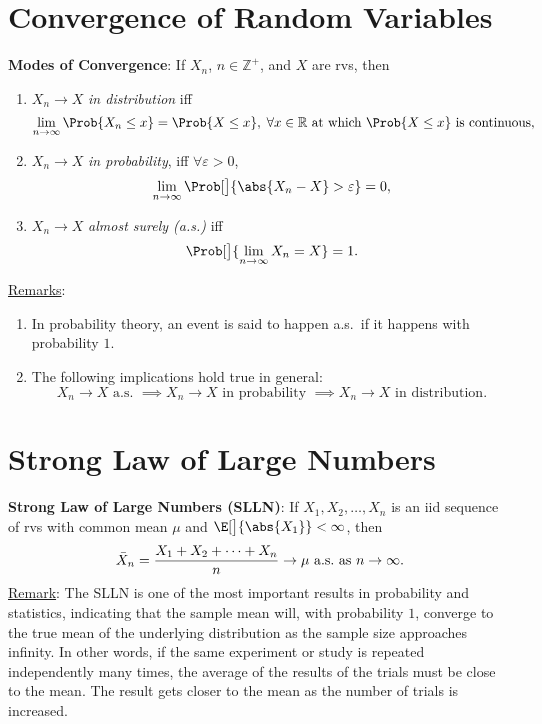 \section*{Convergence of Random Variables}
\begin{Regular}
    \textbf{Modes of Convergence}: If $ X_n $, $ n\in\mathbb{Z}^+ $, and $ X $ are rvs, then
    \begin{enumerate}[1.]
        \item $ X_n\to X $ \emph{in distribution} iff
              \[ \lim\limits_{{n} \to {\infty}} \Prob{X_n\le x}=\Prob{X\le x},\; \forall x\in\mathbb{R}\text{ at which $ \Prob{X\le x} $ is continuous,} \]
        \item $ X_n\to X $ \emph{in probability}, iff $ \forall \varepsilon>0 $,
              \[ \lim\limits_{{n} \to {\infty}} \Prob[\big]{\abs{X_n-X}>\varepsilon}=0, \]
        \item $ X_n\to X $ \emph{almost surely (a.s.)} iff
              \[ \Prob[\big]{\lim\limits_{{n} \to {\infty}} X_n=X}=1. \]
    \end{enumerate}
    \tcblower{}
    \underline{Remarks}:
    \begin{enumerate}[(1)]
        \item In probability theory, an event is said to happen a.s.\ if it happens with probability $ 1 $.
        \item The following implications hold true in general:
              \[ X_n\to X\text{ a.s. }\implies X_n\to X\text{ in probability }\implies X_n\to X\text{ in distribution.} \]
    \end{enumerate}
\end{Regular}
\section*{Strong Law of Large Numbers}
\begin{Regular}
    \textbf{Strong Law of Large Numbers (SLLN)}: If $ X_1,X_2,\ldots,X_n $ is an iid sequence of rvs with common mean $ \mu $
    and $ \E[\big]{\abs{X_1}}<\infty $, then
    \[ \bar{X}_n=\frac{X_1+X_2+\cdots+X_n}{n} \to \mu\text{ a.s.\ as $ n\to\infty $.} \]
    \tcblower{}
    \underline{Remark}: The SLLN is one of the most important results in probability and statistics,
    indicating that the sample mean will, with probability $ 1 $, converge to the true mean of the
    underlying distribution as the sample size approaches infinity. In other words, if the same
    experiment or study is repeated independently many times, the average of the
    results of the trials must be close to the mean. The result gets closer to the mean as the
    number of trials is increased.
\end{Regular}
